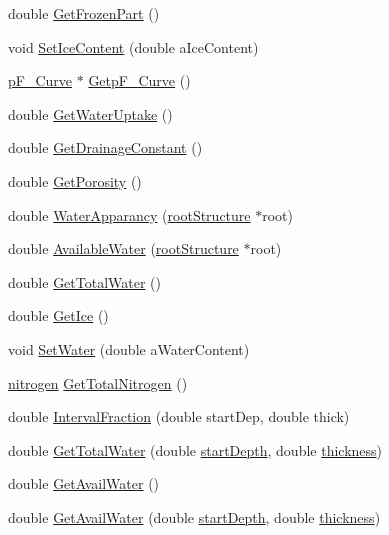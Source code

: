 \begin{DoxyCompactItemize}
double \hyperlink{classsoil_layer_aa0bade5bb8489d4fd5aa4419d95eabed}{GetFrozenPart} ()
\item 
void \hyperlink{classsoil_layer_a1f943c69c9e19526aa5e7e8ef11503fa}{SetIceContent} (double aIceContent)
\item 
\hyperlink{classp_f___curve}{pF\_\-Curve} $\ast$ \hyperlink{classsoil_layer_a444bc7c75f30a1f722d044d7fe8f7033}{GetpF\_\-Curve} ()
\item 
double \hyperlink{classsoil_layer_aa4742cb804f4a91222d0f7a6c6fe6e70}{GetWaterUptake} ()
\item 
double \hyperlink{classsoil_layer_a4aaa4a203fb9bd489fabb45eaee0aa6c}{GetDrainageConstant} ()
\item 
double \hyperlink{classsoil_layer_a7a50b8f89f7bc086de8ed078b729e1a3}{GetPorosity} ()
\item 
double \hyperlink{classsoil_layer_a3c68ae8f97300b4e5e4cd3765c44427d}{WaterApparancy} (\hyperlink{structroot_structure}{rootStructure} $\ast$root)
\item 
double \hyperlink{classsoil_layer_a7286ebbe37f8e4c31bb32f7d44d461e1}{AvailableWater} (\hyperlink{structroot_structure}{rootStructure} $\ast$root)
\item 
double \hyperlink{classsoil_layer_af01077dc70989747d1f48ba46bb0556c}{GetTotalWater} ()
\item 
double \hyperlink{classsoil_layer_ac3ebf6c7d7f1cb21dff528dfb33cf28d}{GetIce} ()
\item 
void \hyperlink{classsoil_layer_aa1344b68a8f85cd0a3e65ead0569c761}{SetWater} (double aWaterContent)
\item 
\hyperlink{classnitrogen}{nitrogen} \hyperlink{classsoil_layer_a8140893eff5a44a15464a49ff837f1de}{GetTotalNitrogen} ()
\item 
double \hyperlink{classsoil_layer_affa95354eeb271651824f92af6b24ca6}{IntervalFraction} (double startDep, double thick)
\item 
double \hyperlink{classsoil_layer_a849537127926fa5f52156405ce315867}{GetTotalWater} (double \hyperlink{classsoil_layer_acbee67e83ac96f6906c03498366616b6}{startDepth}, double \hyperlink{classsoil_layer_adaeedd67db3ed2312056db1469945ffa}{thickness})
\item 
double \hyperlink{classsoil_layer_aadce28fdd5d1a819981785e6f4954674}{GetAvailWater} ()
\item 
double \hyperlink{classsoil_layer_ac5d5fefe115d49e4a6faa7296fa774b6}{GetAvailWater} (double \hyperlink{classsoil_layer_acbee67e83ac96f6906c03498366616b6}{startDepth}, double \hyperlink{classsoil_layer_adaeedd67db3ed2312056db1469945ffa}{thickness})

\end{DoxyCompactItemize}
